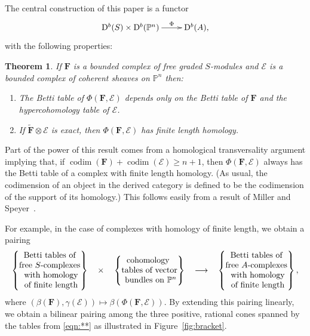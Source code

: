 \documentclass[12pt]{amsart}
\newtheorem{theorem}[lemma]{Theorem}
\theoremstyle{definition}
\theoremstyle{remark}
\newcommand{\codim}{\operatorname{codim}}
\newcommand{\PP}{\mathbb{P}}
\newcommand{\cE}{\mathcal{E}}
\newcommand{\FF}{\mathbf{F}}
\newcommand{\DD}{\mathrm{D}}
\renewcommand{\P}{{\mathbb P}}
\begin{document}
The central construction of this paper is a functor
$$
\xymatrix{\DD^{b}(S)\times \DD^{b}(\PP^{n})  \ar[r]^-{\Phi}&\DD^{b}(A),}
$$
with the following properties:
\begin{theorem}\label{thm:Phi} If $\FF$ is a bounded complex of free graded $S$-modules and $\cE$ is a bounded complex of coherent sheaves on $\P^{n}$ then:
\begin{enumerate}
	\item\label{thm:Phi:1}  The Betti table of $\Phi(\FF,\cE)$ depends only on the Betti table of $\FF$ and the hypercohomology table of $\cE$.
	\item\label{thm:Phi:2}  If $\widetilde{\FF}\otimes \cE$ is exact, then $\Phi(\FF,\cE)$ has finite length homology.  
\end{enumerate}
\end{theorem}

Part of the power of this result comes from a homological transversality argument implying that, if
$\codim(\FF)+\codim(\cE)\geq n+1$, then $\Phi(\FF,\cE)$ always has the Betti table of a complex with finite length homology. (As usual, the codimension of an object in the derived category is defined to be the codimension of the support of its homology.) This follows easily from a result of Miller and Speyer~\cite[Theorem, p.\ 335]{miller-speyer}. 

 For example, in the case of complexes with homology of finite length, we obtain a pairing
 \begin{equation}%
\label{eqn:**}
\begin{tabular}{c c c c c}
$\left\{\begin{matrix}
\text{Betti tables of} \\ \text{free $S$-complexes}\\
\text{ with homology}\\ \text{ of finite length}
\end{matrix}\right\}$
&
$\times$
&
$\left\{\begin{matrix}
\text{cohomology }\\
\text{tables of vector}\\
\text{ bundles on } \PP^n
\end{matrix}\right\}$
&
$\longrightarrow$
&
$\left\{\begin{matrix}
\text{Betti tables of} \\ \text{free $A$-complexes}\\
\text{ with homology}\\ \text{ of finite length}
\end{matrix}\right\},$
\end{tabular}
\end{equation}
where $(\beta(\FF),\gamma(\cE))\mapsto \beta(\Phi(\FF,\cE))$.  By extending this pairing linearly, we obtain a bilinear pairing among the three positive, rational cones spanned by the tables from \eqref{eqn:**} as illustrated in Figure~\ref{fig:bracket}. 
\end{document}
